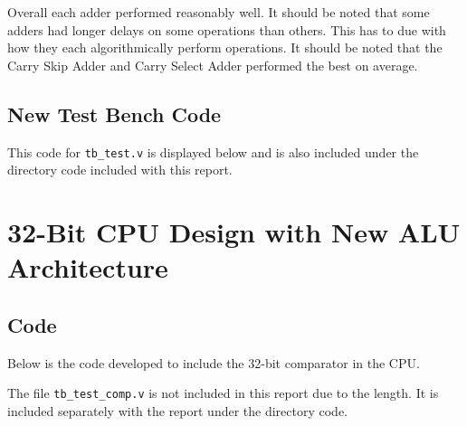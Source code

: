 \documentclass[12pt]{article}
\begin{document}
Overall each adder performed reasonably well. It should be noted that some adders had longer delays on some operations than others. This has to due with how they each algorithmically perform operations. It should be noted that the Carry Skip Adder and Carry Select Adder performed the best on average.
\subsection{New Test Bench Code}
This code for \texttt{tb\_test.v} is displayed below and is also included under the directory code included with this report.


\section{32-Bit CPU Design with New ALU Architecture}
\subsection{Code}
Below is the code developed to include the 32-bit comparator in the CPU.



The file \texttt{tb\_test\_comp.v} is not included in this report due to the length. It is included separately with the report under the directory code.
\end{document}

